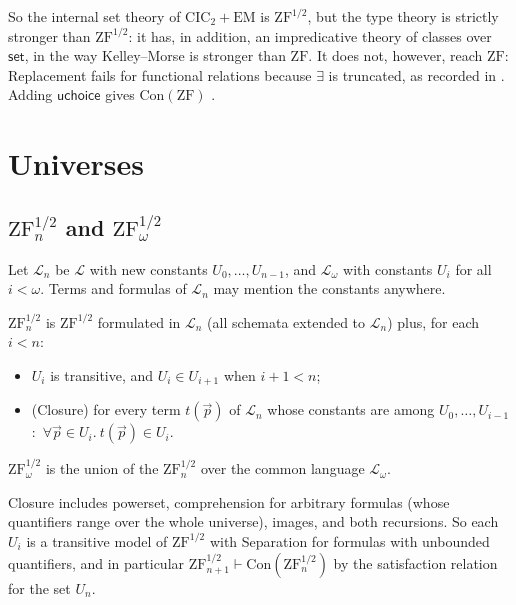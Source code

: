 \documentclass[10pt]{article}
\newcommand{\CIC}{\mathrm{CIC}}
\newcommand{\ZF}{\mathrm{ZF}}
\newcommand{\ZFh}{\mathrm{ZF}^{1/2}}
\newcommand{\EM}{\mathrm{EM}}
\newcommand{\Con}{\mathrm{Con}}
\newcommand{\uchoice}{\mathsf{uchoice}}
\newcommand{\Lang}{\mathcal L}
\begin{document}
So the internal set theory of $\CIC_2+\EM$ is $\ZFh$, but the type theory
is strictly stronger than $\ZFh$: it has, in addition, an impredicative
theory of classes over $\mathsf{set}$, in the way Kelley--Morse is
stronger than $\ZF$. It does not, however, reach $\ZF$: Replacement
fails for functional relations because $\exists$ is truncated, as
recorded in \cite[Remark~2.1, Prop.~5.1]{paper1}. Adding $\uchoice$ gives
$\Con(\ZF)$ \cite{barras10,friedman73}.

\section{Universes}\label{sec:univ}

\subsection{$\ZFh_n$ and $\ZFh_\omega$}

Let $\Lang_n$ be $\Lang$ with new constants $U_0,\dots,U_{n-1}$, and
$\Lang_\omega$ with constants $U_i$ for all $i<\omega$. Terms and
formulas of $\Lang_n$ may mention the constants anywhere.

\begin{definition}
$\ZFh_n$ is $\ZFh$ formulated in $\Lang_n$ (all schemata extended to
$\Lang_n$) plus, for each $i<n$:
\begin{itemize}
\item $U_i$ is transitive, and $U_i\in U_{i+1}$ when $i+1<n$;
\item (Closure) for every term $t(\vec p)$ of $\Lang_n$ whose constants
  are among $U_0,\dots,U_{i-1}$:\ $\forall\vec p\in U_i.\ t(\vec p)\in U_i$.
\end{itemize}
$\ZFh_\omega$ is the union of the $\ZFh_n$ over the common language $\Lang_\omega$.
\end{definition}

Closure includes powerset, comprehension for arbitrary formulas (whose
quantifiers range over the whole universe), images, and both recursions.
So each $U_i$ is a transitive model of $\ZFh$ with Separation for
formulas with unbounded quantifiers, and in particular
$\ZFh_{n+1}\vdash\Con(\ZFh_n)$ by the satisfaction relation for the set
$U_n$.
\end{document}

